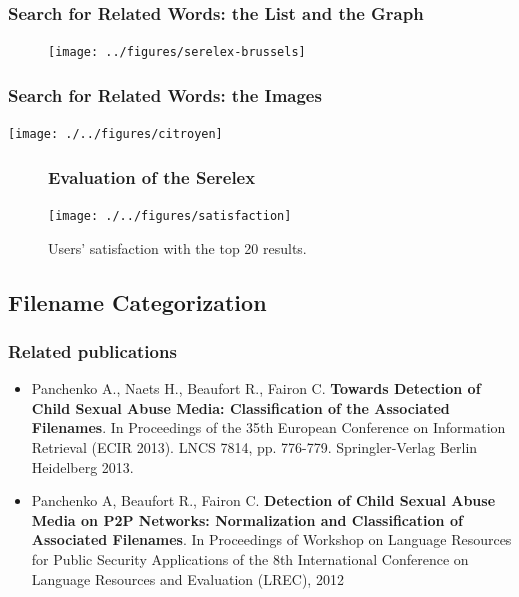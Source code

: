 \begin{frame}
\frametitle{Search for Related Words: the List and the Graph}

\begin{figure}
\centering
\texttt{[image: ../figures/serelex-brussels]}
\end{figure}

\end{frame}




\begin{frame}
\frametitle{Search for Related Words: the Images}

\texttt{[image: ./../figures/citroyen]}

\end{frame}

\begin{frame}

\begin{figure}
\frametitle{Evaluation of the Serelex}

\center
\texttt{[image: ./../figures/satisfaction]}

\caption{Users' satisfaction with the top 20 results.}
\end{figure}
\end{frame}


\subsection{Filename Categorization}


\begin{frame}
\frametitle{Related publications}
\begin{itemize}
\item Panchenko A., Naets H., Beaufort R., Fairon C. \textbf{Towards Detection of Child Sexual Abuse Media: Classification of the Associated Filenames}. In Proceedings of the 35th European Conference on Information Retrieval (ECIR 2013).  LNCS 7814, pp. 776-779. Springler-Verlag Berlin Heidelberg 2013.

\item Panchenko A, Beaufort R., Fairon C. \textbf{Detection of Child Sexual Abuse Media on P2P Networks: Normalization and Classification of Associated Filenames}. In Proceedings of Workshop on Language Resources for Public Security Applications of the 8th International Conference on Language Resources and Evaluation (LREC), 2012

\end{itemize}
\end{frame}



